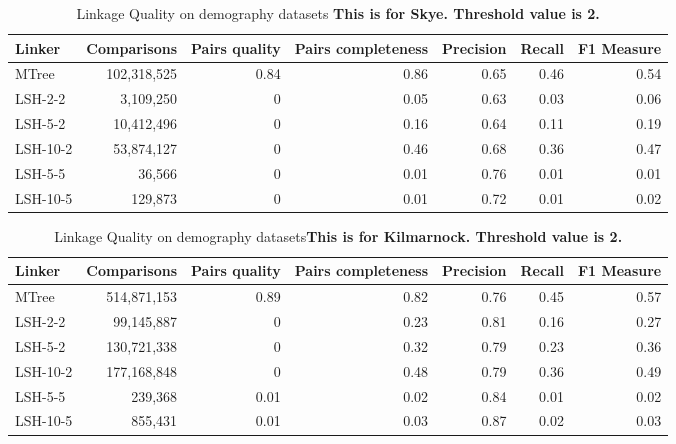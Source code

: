 \documentclass{llncs}
\begin{document}
\begin{table}[ht]
\centering
\begin{tabular}{l|r|r|r|r|r|r}
Linker   & Comparisons & Pairs quality & Pairs completeness & Precision & Recall & F1 Measure \\ \hline
MTree    & 102,318,525         & 0.84                  & 0.86                       & 0.65      & 0.46   & 0.54      \\ \hline
LSH-2-2  & 3,109,250           & 0                     & 0.05                       & 0.63      & 0.03   & 0.06       \\
LSH-5-2  & 10,412,496          & 0                     & 0.16                       & 0.64      & 0.11   & 0.19       \\
LSH-10-2 & 53,874,127          & 0                     & 0.46                       & 0.68      & 0.36   & 0.47       \\
LSH-5-5  & 36,566             & 0                     & 0.01                       & 0.76      & 0.01   & 0.01       \\
LSH-10-5 & 129,873            & 0                     & 0.01                       & 0.72      & 0.01   & 0.02       \\ \hline
\end{tabular}
\caption{Linkage Quality on demography datasets \textbf{This is for Skye. Threshold value is 2.}
\label{comparison-of-results-demography-skye}
}
\end{table}




\begin{table}[ht]
\centering
\begin{tabular}{l|r|r|r|r|r|r}
Linker   & Comparisons & Pairs quality & Pairs completeness & Precision & Recall & F1 Measure \\ \hline
MTree     & 514,871,153         & 0.89                  & 0.82                       & 0.76      & 0.45   & 0.57      \\ \hline
LSH-2-2   & 99,145,887          & 0                     & 0.23                       & 0.81      & 0.16   & 0.27       \\
LSH-5-2   & 130,721,338         & 0                     & 0.32                       & 0.79      & 0.23   & 0.36       \\
LSH-10-2  & 177,168,848         & 0                     & 0.48                       & 0.79      & 0.36   & 0.49       \\
LSH-5-5   & 239,368            & 0.01                  & 0.02                       & 0.84      & 0.01   & 0.02       \\
LSH-10-5  & 855,431            & 0.01                  & 0.03                       & 0.87      & 0.02   & 0.03 \\ \hline
\end{tabular}
\caption{Linkage Quality on demography datasets\textbf{This is for Kilmarnock. Threshold value is 2.}
\label{comparison-of-results-demography-kili}
}
\end{table}
\end{document}
